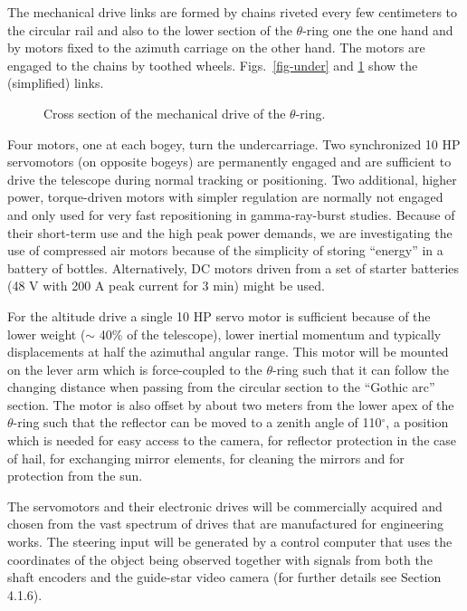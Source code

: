 The mechanical drive links are formed by chains riveted every few
centimeters to the circular rail and also to the lower section of the $%
\theta $-ring one the one hand and by motors fixed to the azimuth carriage
on the other hand. The motors are engaged to the chains by toothed wheels.
Figs.~\ref{fig-under} and \ref{fig-antrieb}
show the (simplified) links. 
\begin{figure}[htb]
\leavevmode
\centering
\epsfxsize=10cm
\begin{turn}{90}
\end{turn}
\caption{Cross section of the mechanical drive of the $\theta$-ring.}
\label{fig-antrieb}
\end{figure}
Four motors, one at
each bogey, turn the undercarriage. Two synchronized 10 HP servomotors (on
opposite bogeys) are permanently engaged and are sufficient to drive the
telescope during normal tracking or positioning. Two additional, higher
power, torque-driven motors with simpler regulation are normally not engaged
and only used for very fast repositioning in gamma-ray-burst studies.
Because of their short-term use and the high peak power demands, we are
investigating the use of compressed air motors because of the simplicity of
storing ``energy'' in a battery of bottles. Alternatively, DC motors driven
from a set of starter batteries (48 V with 200 A peak current for 3 min)
might be used.

For the altitude drive a single 10 HP servo motor is sufficient because of
the lower weight ($\sim$ 40\% of the telescope), lower inertial momentum and
typically displacements at half the azimuthal angular range. This motor will be
mounted on the lever arm which is force-coupled to the $\theta$-ring such
that it can follow the changing distance when passing from the circular
section to the ``Gothic arc'' section. The motor is also offset by about two
meters from the lower apex of the $\theta$-ring such that the reflector can be
moved to a zenith angle of 110$^\circ$, a position which is needed for easy
access to the camera, for reflector protection in the case of hail, for
exchanging mirror elements, for cleaning the mirrors and for protection from
the sun.

The servomotors and their electronic drives will be commercially acquired
and chosen from the vast spectrum of drives that are manufactured for
engineering works. The steering input will be generated by a control
computer that uses the coordinates of the object being observed together
with signals from both the shaft encoders and the guide-star video camera
(for further details see Section 4.1.6).

